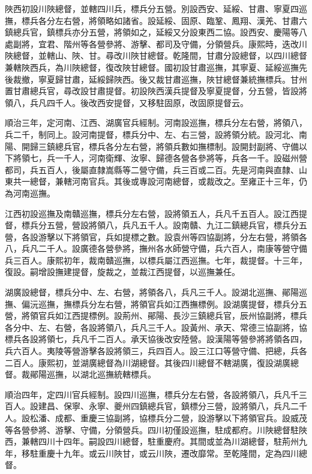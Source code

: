 \begin{pinyinscope}
陜西初設川陜總督，並轄四川兵，標兵分五營。別設西安、延綏、甘肅、寧夏四巡撫，標兵各分左右營，將領略如諸省。設延綏、固原、臨鞏、鳳翔、漢羌、甘肅六鎮總兵官，鎮標兵亦分五營，將領如之，延綏又分設東西二協。設西安、慶陽等八處副將，宜君、階州等各營參將、游擊、都司及守備，分領營兵。康熙時，迭改川陜總督，並轄山、陜、甘。尋改川陜甘總督。乾隆間，甘肅分設總督，以四川總督兼轄陜西兵，為川陜總督，復改陜甘總督。國初設甘肅巡撫，其寧夏、延綏巡撫先後裁撤，寧夏歸甘肅，延綏歸陜西。後又裁甘肅巡撫，陜甘總督兼統撫標兵。甘州置甘肅總兵官，尋改設甘肅提督。初設陜西漢兵提督及寧夏提督，分五營，皆設將領八，兵凡四千人。後改西安提督，又移駐固原，改固原提督云。

順治三年，定河南、江西、湖廣官兵經制。河南設巡撫，標兵分左右營，將領八，兵二千，制同上。設河南提督，標兵分中、左、右三營，設將領分統。設河北、南陽、開歸三鎮總兵官，標兵各分左右營，將領兵數如撫標制。設開封副將、守備以下將領七，兵一千人，河南衛輝、汝寧、歸德各營各參將等，兵各一千。設磁州營都司，兵五百人，後屬直隸嵩縣等二營守備，兵三百或二百。先是河南與直隸、山東共一總督，兼轄河南官兵。其後或專設河南總督，或裁改之。至雍正十三年，仍為河南巡撫。

江西初設巡撫及南贛巡撫，標兵分左右營，設將領五人，兵凡千五百人。設江西提督，標兵分五營，營設將領八，兵凡五千人。設南贛、九江二鎮總兵官，標兵分五營，各設游擊以下將領官，兵如提標之數。設袁州等四協副將，分左右營，將領各八，兵凡二千人。設廣德各營參將，撫州各水師營守備，兵六百人，南康等營守備兵三百人。康熙初年，裁南贛巡撫，以標兵屬江西巡撫。七年，裁提督。十三年，復設。嗣增設撫建提督，旋裁之，並裁江西提督，以巡撫兼任。

湖廣設總督，標兵分中、左、右營，將領各八，兵凡三千人。設湖北巡撫、鄖陽巡撫、偏沅巡撫，撫標兵分左右營，將領官兵如江西撫標例。設湖廣提督，標兵分五營，將領官兵如江西提標例。設荊州、鄖陽、長沙三鎮總兵官，辰州協副將，標兵各分中、左、右營，各設將領八，兵凡三千人。設黃州、承天、常德三協副將，協標兵各設將領七，兵凡千二百人。承天協後改安陸營。設漢陽等營參將將領各四，兵六百人。夷陵等營游擊各設將領三，兵四百人。設三江口等營守備、把總，兵各二百人。康熙初，並湖廣總督為川湖總督。其後四川總督不轄湖廣，復設湖廣總督。裁鄖陽巡撫，以湖北巡撫統轄標兵。

順治四年，定四川官兵經制。設四川巡撫，標兵分左右營，各設將領八，兵凡千三百人。設建昌、保寧、永寧、夔州四鎮總兵官，鎮標分三營，設將領八，兵凡二千人。設松潘、成都、重慶三協副將，協標兵分二營，設游擊以下將領官兵。設威茂等各營參將、游擊、守備，分領營兵。四川初僅設巡撫，駐成都府。川陜總督駐陜西，兼轄四川十四年。嗣設四川總督，駐重慶府。其間或並為川湖總督，駐荊州九年，移駐重慶十九年。或云川陜甘，或云川陜，遷改靡常。至乾隆間，定為四川總督。


\end{pinyinscope}
